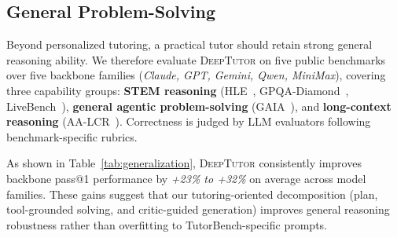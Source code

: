 \subsection{General Problem-Solving}
\label{sec:generalization}

Beyond personalized tutoring, a practical tutor should retain strong general reasoning ability.
We therefore evaluate \textsc{DeepTutor} on five public benchmarks over five backbone families (\textit{Claude, GPT, Gemini, Qwen, MiniMax}), covering three capability groups:
\textbf{STEM reasoning} (HLE~\citep{phan2025hle}, GPQA-Diamond~\citep{rein2024gpqa}, LiveBench~\citep{white2025livebench}),
\textbf{general agentic problem-solving} (GAIA~\citep{mialon2024gaia}),
and \textbf{long-context reasoning} (AA-LCR~\citep{artificialanalysis2025lcr}).
Correctness is judged by LLM evaluators following benchmark-specific rubrics.

As shown in Table~\ref{tab:generalization}, \textsc{DeepTutor} consistently improves backbone pass@1 performance by \textit{+23\% to +32\%} on average across model families.
These gains suggest that our tutoring-oriented decomposition (plan, tool-grounded solving, and critic-guided generation) improves general reasoning robustness rather than overfitting to TutorBench-specific prompts.
  